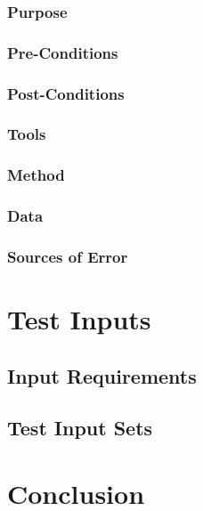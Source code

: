 \documentclass[letterpaper,10pt]{article}
\begin{document}
\subsubsection{Purpose}
\subsubsection{Pre-Conditions}
\subsubsection{Post-Conditions}
\subsubsection{Tools}
\subsubsection{Method}
\subsubsection{Data}
\subsubsection{Sources of Error}

\section{Test Inputs}
\subsection{Input Requirements}
\subsection{Test Input Sets}

\section{Conclusion}
\end{document}
